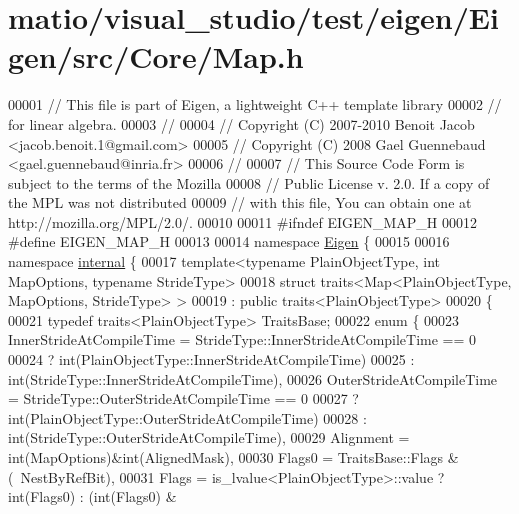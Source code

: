 \hypertarget{matio_2visual__studio_2test_2eigen_2_eigen_2src_2_core_2_map_8h_source}{}\section{matio/visual\+\_\+studio/test/eigen/\+Eigen/src/\+Core/\+Map.h}
\label{matio_2visual__studio_2test_2eigen_2_eigen_2src_2_core_2_map_8h_source}

\begin{DoxyCode}
00001 \textcolor{comment}{// This file is part of Eigen, a lightweight C++ template library}
00002 \textcolor{comment}{// for linear algebra.}
00003 \textcolor{comment}{//}
00004 \textcolor{comment}{// Copyright (C) 2007-2010 Benoit Jacob <jacob.benoit.1@gmail.com>}
00005 \textcolor{comment}{// Copyright (C) 2008 Gael Guennebaud <gael.guennebaud@inria.fr>}
00006 \textcolor{comment}{//}
00007 \textcolor{comment}{// This Source Code Form is subject to the terms of the Mozilla}
00008 \textcolor{comment}{// Public License v. 2.0. If a copy of the MPL was not distributed}
00009 \textcolor{comment}{// with this file, You can obtain one at http://mozilla.org/MPL/2.0/.}
00010 
00011 \textcolor{preprocessor}{#ifndef EIGEN\_MAP\_H}
00012 \textcolor{preprocessor}{#define EIGEN\_MAP\_H}
00013 
00014 \textcolor{keyword}{namespace }\hyperlink{namespace_eigen}{Eigen} \{ 
00015 
00016 \textcolor{keyword}{namespace }\hyperlink{namespaceinternal}{internal} \{
00017 \textcolor{keyword}{template}<\textcolor{keyword}{typename} PlainObjectType, \textcolor{keywordtype}{int} MapOptions, \textcolor{keyword}{typename} Str\textcolor{keywordtype}{id}eType>
00018 \textcolor{keyword}{struct }traits<Map<PlainObjectType, MapOptions, StrideType> >
00019   : \textcolor{keyword}{public} traits<PlainObjectType>
00020 \{
00021   \textcolor{keyword}{typedef} traits<PlainObjectType> TraitsBase;
00022   \textcolor{keyword}{enum} \{
00023     InnerStrideAtCompileTime = StrideType::InnerStrideAtCompileTime == 0
00024                              ? int(PlainObjectType::InnerStrideAtCompileTime)
00025                              : int(StrideType::InnerStrideAtCompileTime),
00026     OuterStrideAtCompileTime = StrideType::OuterStrideAtCompileTime == 0
00027                              ? int(PlainObjectType::OuterStrideAtCompileTime)
00028                              : int(StrideType::OuterStrideAtCompileTime),
00029     Alignment = int(MapOptions)&int(AlignedMask),
00030     Flags0 = TraitsBase::Flags & (~NestByRefBit),
00031     Flags = is\_lvalue<PlainObjectType>::value ? int(Flags0) : (int(Flags0) & ~

\end{DoxyCode}
